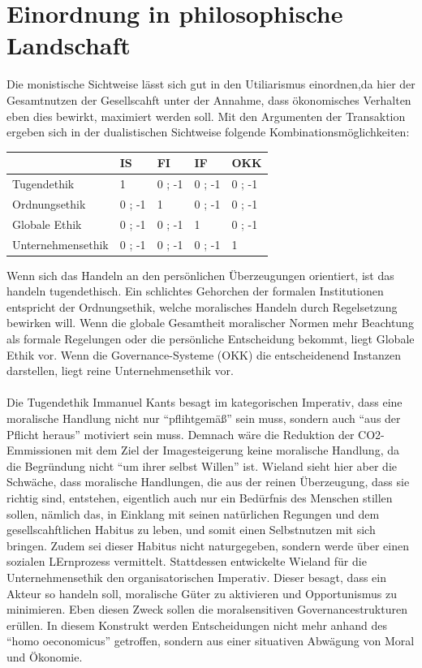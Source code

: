 \documentclass[12pt]{article}
\begin{document}
\section{Einordnung in philosophische Landschaft}
Die monistische Sichtweise lässt sich gut in den Utiliarismus einordnen,da hier der Gesamtnutzen der Gesellscahft unter der Annahme, dass ökonomisches Verhalten eben dies bewirkt, maximiert werden soll. Mit den Argumenten der Transaktion ergeben sich in der dualistischen Sichtweise folgende Kombinationsmöglichkeiten:
\begin{center}
\begin{tabular}{|p{4cm}|p{2cm}|p{2cm}|p{2cm}|p{2cm}|}
\hline
 { } & IS & FI & IF & OKK\\\hline
 Tugendethik & 1 & 0 ; -1 & 0 ; -1 & 0 ; -1\\\hline
 Ordnungsethik & 0 ; -1 & 1 & 0 ; -1 & 0 ; -1\\\hline
 Globale Ethik & 0 ; -1 & 0 ; -1 & 1 & 0 ; -1\\\hline
 Unternehmensethik & 0 ; -1 & 0 ; -1 & 0 ; -1 & 1\\\hline
\end{tabular}
\end{center}
Wenn sich das Handeln an den persönlichen Überzeugungen orientiert, ist das handeln tugendethisch. Ein schlichtes Gehorchen der formalen Institutionen entspricht der Ordnungsethik, welche moralisches Handeln durch Regelsetzung bewirken will. Wenn die globale Gesamtheit moralischer Normen mehr Beachtung als formale Regelungen oder die persönliche Entscheidung bekommt, liegt Globale Ethik vor. Wenn die Governance-Systeme (OKK) die entscheidenend Instanzen darstellen, liegt reine Unternehmensethik vor.\\
\\
Die Tugendethik Immanuel Kants besagt im kategorischen Imperativ, dass eine moralische Handlung nicht nur “pflihtgemäß” sein muss, sondern auch “aus der Pflicht heraus” motiviert sein muss. Demnach wäre die Reduktion der CO2-Emmissionen mit dem Ziel der Imagesteigerung keine moralische Handlung, da die Begründung nicht “um ihrer selbst Willen” ist. Wieland sieht hier aber die Schwäche, dass moralische Handlungen, die aus der reinen Überzeugung, dass sie richtig sind, entstehen, eigentlich auch nur ein Bedürfnis des Menschen stillen sollen, nämlich das, in Einklang mit seinen natürlichen Regungen und dem gesellscahftlichen Habitus zu leben, und somit einen Selbstnutzen mit sich bringen. Zudem sei dieser Habitus nicht naturgegeben, sondern werde über einen sozialen LErnprozess vermittelt. Stattdessen entwickelte Wieland für die Unternehmensethik den organisatorischen Imperativ. Dieser besagt, dass ein Akteur so handeln soll, moralische Güter zu aktivieren und Opportunismus zu minimieren. Eben diesen Zweck sollen die moralsensitiven Governancestrukturen erüllen. In diesem Konstrukt werden Entscheidungen nicht mehr anhand des “homo oeconomicus” getroffen, sondern aus einer situativen Abwägung von Moral und Ökonomie.
\clearpage
\frontmatter%
\renewcommand{\plaintitle}{Literaturverzeichnis}
\setcounter{page}{5}
\printMyBibliography
\end{document}
